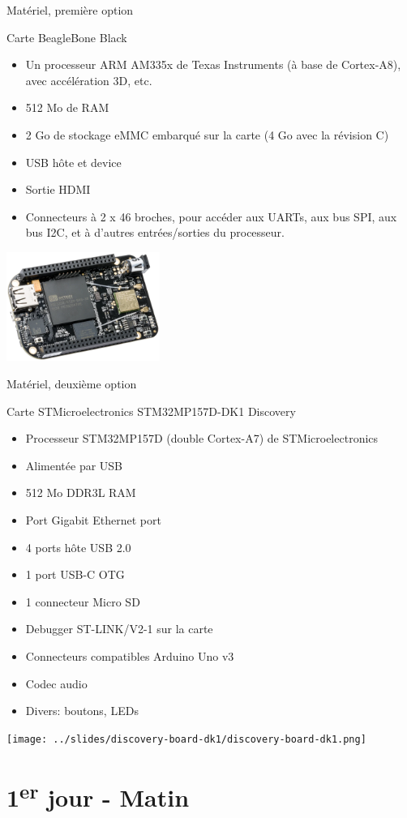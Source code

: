 \documentclass[a4paper,12pt,obeyspaces,spaces,hyphens]{article}
\begin{document}
\feagendatwocolumn
{Matériel, première option}
{
  Carte BeagleBone Black
  \begin{itemize}
  \item Un processeur ARM AM335x de Texas Instruments (à base de
    Cortex-A8), avec accélération 3D, etc.
  \item 512 Mo de RAM
  \item 2 Go de stockage eMMC embarqué sur la carte
	\newline(4 Go avec la révision C)
  \item USB hôte et device
  \item Sortie HDMI
  \item Connecteurs à 2 x 46 broches, pour accéder aux UARTs, aux
        bus SPI, aux bus I2C, et à d'autres entrées/sorties du
        processeur.
  \end{itemize}
  \includegraphics[width=5cm]{../slides/beagleboneblack-board/beagleboneblack.png}
}
{Matériel, deuxième option}
{
  Carte STMicroelectronics STM32MP157D-DK1 Discovery
  \begin{itemize}
  \item Processeur STM32MP157D (double Cortex-A7) de STMicroelectronics
  \item Alimentée par USB
  \item 512 Mo DDR3L RAM
  \item Port Gigabit Ethernet port
  \item 4 ports hôte USB 2.0
  \item 1 port USB-C OTG
  \item 1 connecteur Micro SD
  \item Debugger ST-LINK/V2-1 sur la carte
  \item Connecteurs compatibles Arduino Uno v3
  \item Codec audio
  \item Divers: boutons, LEDs
  \end{itemize}
  \texttt{[image: ../slides/discovery-board-dk1/discovery-board-dk1.png]}
}

\section{1\textsuperscript{er} jour - Matin}
\end{document}

